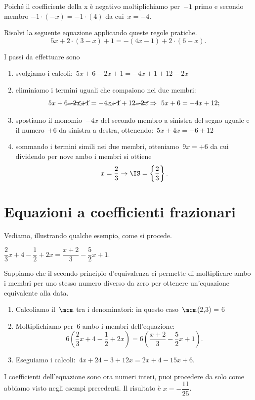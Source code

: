 Poiché il coefficiente della x è negativo moltiplichiamo per~$-1$
primo e secondo membro
$-1\cdot (-x)=-1\cdot (4)$ da cui~$x=-4$.

\begin{problema}
 Risolvi la seguente equazione applicando queste regole pratiche.
 \[5x+2\cdot (3-x)+1=-(4x-1)+2\cdot (6-x).\]
\end{problema}

\begin{soluzione}
I passi da effettuare sono
\begin{enumerate}
 \item svolgiamo i calcoli:~$5x+6-2x+1=-4x+1+12-2x$
 \item eliminiamo i termini uguali che compaiono nei due membri:
 \[5x+6 \cancel{-2x}\cancel{+1}=-4x 
\cancel{+1}+12\cancel{-2x}\Rightarrow~5x+6=-4x+12;\]
 \item spostiamo il monomio~$-4x$ del secondo membro a sinistra del segno uguale 
e il numero~$+6$
da sinistra a destra, ottenendo:~$5x+4x=-6+12$
\item sommando i termini simili nei due membri, otteniamo~$9x=+6$ da cui 
dividendo per nove
 ambo i membri si ottiene
 \[x=\dfrac{2}{3}\to \IS =\left\{\dfrac{2}{3}\right\}.\]
 \end{enumerate}

\end{soluzione}

\section{Equazioni a coefficienti frazionari}
\label{sec:13_coefffraz}

Vediamo, illustrando qualche esempio, come si procede.

\begin{exrig}
 \begin{esempio}
$\dfrac{2}{3}x+4-\dfrac{1}{2}+2x=\dfrac{x+2}{3}-\dfrac{5}{2}x+1$.

Sappiamo che il secondo principio d'equivalenza ci
permette di moltiplicare ambo i membri per uno stesso numero diverso da
zero per ottenere un'equazione equivalente alla data.

\begin{enumerate}
 \item Calcoliamo il~$\mcm$ tra i denominatori: in questo
caso~$\mcm$(2,3) = 6
 \item Moltiplichiamo per~6 ambo i membri
dell'equazione:
\[6\left(\dfrac{2}{3}x+4-\dfrac{1}{2}+2x\right)=6\left(\dfrac{x+2}{3}-\dfrac{5}{
2}x+1\right).\]
 \item Eseguiamo i calcoli:~$4x+24-3+12x=2x+4-15x+6$.
\end{enumerate}

I coefficienti dell'equazione sono ora numeri interi,
puoi procedere da solo come abbiamo visto negli esempi precedenti. Il risultato 
è $x=-\dfrac{11}{25}$.
\end{esempio}
\end{exrig}


